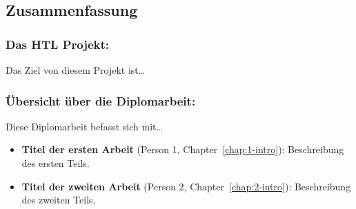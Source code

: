 \begin{flushleft}

	\subsection*{Zusammenfassung}

		\subsubsection*{Das HTL Projekt:}

		Das Ziel von diesem Projekt ist\dots

		\subsubsection*{Übersicht über die Diplomarbeit:}

		Diese Diplomarbeit befasst sich mit\dots

		\begin{itemize}
			\item \textbf{Titel der ersten Arbeit} (Person 1, Chapter~\ref{chap:1-intro}): Beschreibung des ersten Teils.
			
			\item \textbf{Titel der zweiten Arbeit} (Person 2, Chapter~\ref{chap:2-intro}): Beschreibung des zweiten Teils.
		\end{itemize}
\end{flushleft}